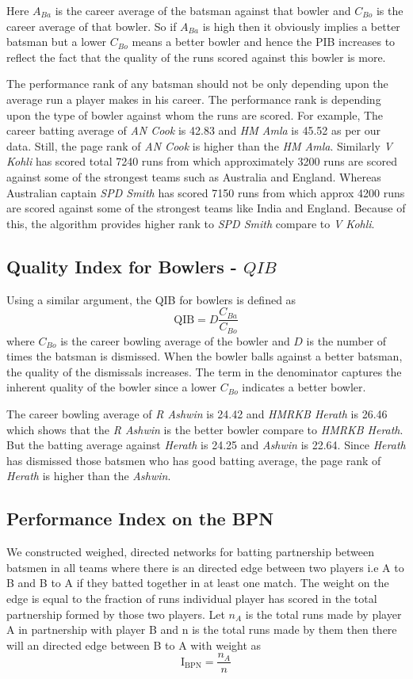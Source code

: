 \documentclass{article}
\begin{document}
Here $A_{Ba}$ is the career average of the batsman against that bowler and $C_{Bo}$ is the career average of that bowler. So if $A_{Ba}$ is high then it obviously implies a better batsman but a lower $C_{Bo}$ means a better bowler and hence the PIB increases to reflect the fact that the quality of the runs scored against this bowler is more.

The performance rank of any batsman should not be only depending upon the average run a player makes in his career. The performance rank is depending upon the type of bowler against whom the runs are scored. For example, The career batting average of \textit{AN Cook} is 42.83 and \textit{HM Amla} is 45.52 as per our data. Still, the page rank of \textit{AN Cook} is higher than the \textit{HM Amla}. Similarly \textit{V Kohli} has scored total 7240 runs from which approximately 3200 runs are scored against some of the strongest teams such as Australia and England. Whereas Australian captain \textit{SPD Smith} has scored 7150 runs from which approx 4200 runs are scored against some of the strongest teams like India and England. Because of this, the algorithm provides higher rank to \textit{SPD Smith} compare to \textit{V Kohli}. 

\subsection{Quality Index for Bowlers - $QIB$}
Using a similar argument, the QIB for bowlers is defined as $$\mathrm{QIB} = D\frac{C_{Ba}}{C_{Bo}}$$ where $C_{Bo}$ is the career bowling average of the bowler and $D$ is the number of times the batsman is dismissed. When the bowler balls against a better batsman, the quality of the dismissals increases. The term in the denominator captures the inherent quality of the bowler since a lower $C_{Bo}$ indicates a better bowler.

The career bowling average of \textit{R Ashwin} is 24.42 and \textit{HMRKB Herath} is 26.46 which shows that the \textit{R Ashwin} is the better bowler compare to \textit{HMRKB Herath}. But the batting average against \textit{Herath} is 24.25 and \textit{Ashwin} is 22.64. Since \textit{Herath} has dismissed those batsmen who has good batting average, the page rank of \textit{Herath} is higher than the \textit{Ashwin}. 

\subsection{Performance Index on the BPN}
We constructed weighed, directed networks for batting partnership between batsmen in all teams where there is an directed edge between two players i.e A to B and B to A if they batted together in at least one match. The weight on the edge is equal to the fraction of runs individual player has scored in the total partnership formed by those two players. Let $n_A$ is the total runs made by player A in partnership with player B and n is the total runs made by them then there will an directed edge between B to A with weight as $$\mathrm{I_{BPN}} = \frac{n_A}{n}$$
\end{document}
